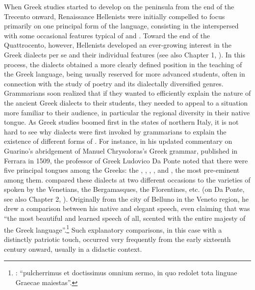 When Greek studies started to develop on the  peninsula from the end of the Trecento onward, Renaissance Hellenists were initially compelled to focus primarily on one principal form of the language, consisting in the  interspersed with some occasional features typical of  and . Toward the end of the Quattrocento, however, Hellenists developed an ever-growing interest in the Greek dialects per se and their individual features (see also Chapter 1, ). In this process, the dialects obtained a more clearly defined position in the teaching of the Greek language, being usually reserved for more advanced students, often in connection with the study of poetry and its dialectally diversified genres. Grammarians soon realized that if they wanted to efficiently explain the nature of the ancient Greek dialects to their students, they needed to appeal to a situation more familiar to their audience, in particular the regional diversity in their native  tongue. As Greek studies boomed first in the states of northern Italy, it is not hard to see why  dialects were first invoked by  grammarians to explain the existence of different forms of . For instance, in his updated commentary on Guarino’s abridgement of Manuel Chrysoloras’s Greek grammar, published in Ferrara in 1509, the professor of Greek Ludovico Da Ponte noted that there were five principal tongues among the Greeks: the , , , , and , the most pre-eminent among them.  compared these dialects at two different occasions to the varieties of  spoken by the Venetians, the Bergamasques, the Florentines, etc. (on Da Ponte, see also Chapter 2, ). Originally from the city of Belluno in the Veneto region, he drew a comparison between his native  and elegant  speech, even claiming that  was “the most beautiful and learned speech of all, scented with the entire majesty of the Greek language”.\footnote{: “pulcherrimus et doctissimus omnium sermo, in quo redolet tota linguae Graecae maiestas”.} Such explanatory comparisons, in this case with a distinctly patriotic touch, occurred very frequently from the early sixteenth century onward, usually in a didactic context.

